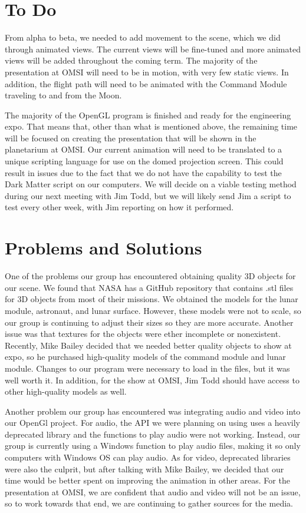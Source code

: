 \documentclass[onecolumn, draftclsnofoot,10pt, compsoc]{IEEEtran}
\begin{document}
\section{To Do}

From alpha to beta, we needed to add movement to the scene, which we did through animated views. The current views will be fine-tuned and more animated views will be added throughout the coming term. The majority of the presentation at OMSI will need to be in motion, with very few static views. In addition, the flight path will need to be animated with the Command Module traveling to and from the Moon. 

The majority of the OpenGL program is finished and ready for the engineering expo. That means that, other than what is mentioned above, the remaining time will be focused on creating the presentation that will be shown in the planetarium at OMSI. Our current animation will need to be translated to a unique scripting language for use on the domed projection screen. This could result in issues due to the fact that we do not have the capability to test the Dark Matter script on our computers. We will decide on a viable testing method during our next meeting with Jim Todd, but we will likely send Jim a script to test every other week, with Jim reporting on how it performed. 


\section{Problems and Solutions}

One of the problems our group has encountered obtaining quality 3D objects for our scene. We found that NASA has a GitHub repository that contains .stl files for 3D objects from most of their missions. We obtained the models for the lunar module, astronaut, and lunar surface. However, these models were not to scale, so our group is continuing to adjust their sizes so they are more accurate. Another issue was that textures for the objects were ether incomplete or nonexistent. Recently, Mike Bailey decided that we needed better quality objects to show at expo, so he purchased high-quality models of the command module and lunar module. Changes to our program were necessary to load in the files, but it was well worth it. In addition, for the show at OMSI, Jim Todd should have access to other high-quality models as well.  

Another problem our group has encountered was integrating audio and video into our OpenGl project. For audio, the API we were planning on using uses a heavily deprecated library and the functions to play audio were not working. Instead, our group is currently using a Windows function to play audio files, making it so only computers with Windows OS can play audio. As for video, deprecated libraries were also the culprit, but after talking with Mike Bailey, we decided that our time would be better spent on improving the animation in other areas. For the presentation at OMSI, we are confident that audio and video will not be an issue, so to work towards that end, we are continuing to gather sources for the media. 
\end{document}

